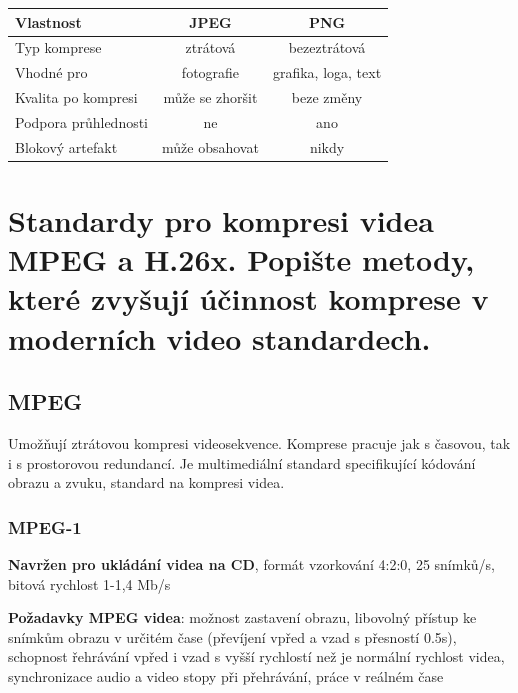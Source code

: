 \begin{table}[h]
\centering
\small
\begin{tabular}{|l|c|c|}
\hline
\textbf{Vlastnost}      & \textbf{JPEG}           & \textbf{PNG}           \\
\hline
Typ komprese            & ztrátová                & bezeztrátová           \\
\hline
Vhodné pro              & fotografie              & grafika, loga, text    \\
\hline
Kvalita po kompresi     & může se zhoršit         & beze změny             \\
\hline
Podpora průhlednosti    & ne                      & ano                    \\
\hline
Blokový artefakt               & může obsahovat          & nikdy                  \\
\hline
\end{tabular}
\end{table}



\section{Standardy pro kompresi videa MPEG a H.26x. Popište metody, které zvyšují účinnost komprese v moderních video standardech.}

\subsection{MPEG}
Umožňují ztrátovou kompresi videosekvence. Komprese pracuje jak s časovou, tak i s prostorovou redundancí. Je multimediální standard specifikující kódování obrazu a zvuku, standard na kompresi videa.

\subsubsection{MPEG-1}
\textbf{Navržen pro ukládání videa na CD}, formát vzorkování 4:2:0, 25 snímků/s, bitová rychlost 1-1,4 Mb/s

\textbf{Požadavky MPEG videa}: možnost zastavení obrazu, libovolný přístup ke snímkům obrazu v určitém čase (převíjení vpřed a vzad s přesností 0.5s), schopnost řehrávání vpřed i vzad s vyšší rychlostí než je normální rychlost videa, synchronizace audio a video stopy při přehrávání, práce v reálném čase

